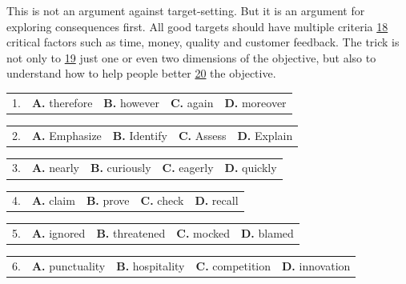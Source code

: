 \documentclass[UTF8,11pt]{ctexart}
\begin{document}
This is not an argument against target-setting. But it is an argument for exploring consequences first. All good targets should have multiple criteria \uline{18} critical factors such as time, money, quality and customer feedback. The trick is not only to \uline{19} just one or even two dimensions of the objective, but also to understand how to help people better \uline{20} the objective.


\noindent\begin{tabularx}{\linewidth}{@{}lXXXX@{}}1. & \textbf{A.} therefore & \textbf{B.} however & \textbf{C.} again & \textbf{D.} moreover\\\end{tabularx}\par

\noindent\begin{tabularx}{\linewidth}{@{}lXXXX@{}}2. & \textbf{A.} Emphasize & \textbf{B.} Identify & \textbf{C.} Assess & \textbf{D.} Explain\\\end{tabularx}\par

\noindent\begin{tabularx}{\linewidth}{@{}lXXXX@{}}3. & \textbf{A.} nearly & \textbf{B.} curiously & \textbf{C.} eagerly & \textbf{D.} quickly\\\end{tabularx}\par

\noindent\begin{tabularx}{\linewidth}{@{}lXXXX@{}}4. & \textbf{A.} claim & \textbf{B.} prove & \textbf{C.} check & \textbf{D.} recall\\\end{tabularx}\par

\noindent\begin{tabularx}{\linewidth}{@{}lXXXX@{}}5. & \textbf{A.} ignored & \textbf{B.} threatened & \textbf{C.} mocked & \textbf{D.} blamed\\\end{tabularx}\par

\noindent\begin{tabularx}{\linewidth}{@{}lXXXX@{}}6. & \textbf{A.} punctuality & \textbf{B.} hospitality & \textbf{C.} competition & \textbf{D.} innovation\\\end{tabularx}\par
\end{document}
